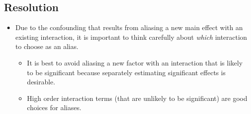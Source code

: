 \subsection{Resolution}
\begin{itemize}[*]
      \item Due to the confounding that results from aliasing a new main effect with an existing interaction, it is
            important to think carefully about \emph{which} interaction to choose as an alias.
            \begin{itemize}[*]
                  \item It is best to avoid aliasing a new factor with an interaction that is likely to be significant because
                        separately estimating significant effects is desirable.
            \end{itemize}
            \begin{itemize}
                  \item High order interaction terms (that are unlikely to be significant) are good choices for aliases.
            \end{itemize}
\end{itemize}
